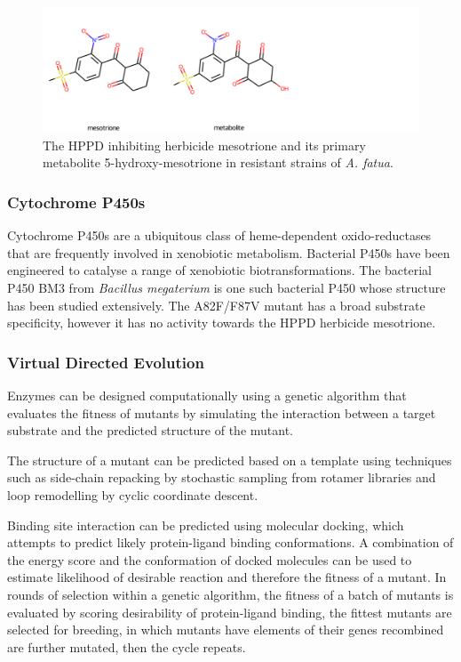 \documentclass[16pt]{book}
\begin{document}
\begin{figure}
	\includegraphics[width=\textwidth]{img/mesotrione+metabolite.png}
	\caption{\label{mesotrione} The HPPD inhibiting herbicide mesotrione and its primary metabolite 5-hydroxy-mesotrione in resistant strains of \textit{A. fatua}.}
\end{figure}

\subsubsection{Cytochrome P450s}
Cytochrome P450s are a ubiquitous class of heme-dependent oxido-reductases that are frequently involved in xenobiotic metabolism. %
Bacterial P450s have been engineered to catalyse a range of xenobiotic biotransformations. 
The bacterial P450 BM3 from \textit{Bacillus megaterium} is one such bacterial P450 whose structure has been studied extensively. 
The A82F/F87V mutant has a broad substrate specificity, however it has no activity towards the HPPD herbicide mesotrione. %

\subsubsection{Virtual Directed Evolution}
Enzymes can be designed computationally using a genetic algorithm that evaluates the fitness of mutants by simulating the interaction between a target substrate and the predicted structure of the mutant. %

The structure of a mutant can be predicted based on a template using techniques such as side-chain repacking by stochastic sampling from rotamer libraries and loop remodelling by cyclic coordinate descent. %

Binding site interaction can be predicted using molecular docking, which attempts to predict likely protein-ligand binding conformations. 
A combination of the energy score and the conformation of docked molecules can be used to estimate likelihood of desirable reaction and therefore the fitness of a mutant. %
In rounds of selection within a genetic algorithm, the fitness of a batch of mutants is evaluated by scoring desirability of protein-ligand binding, the fittest mutants are selected for breeding, in which mutants have elements of their genes recombined are further mutated, then the cycle repeats.   %
\end{document}

